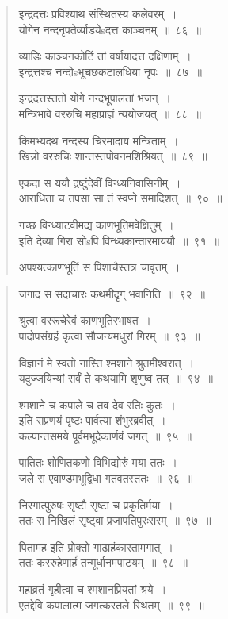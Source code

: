 \documentclass[11pt, openany]{book}
\begin{document}
\begin{multicols}{2}
\begin{quote}
{इन्द्रदत्तः प्रविश्याथ संस्थितस्य कलेवरम्~।\\
योगेन नन्दनृपतेर्व्याड्येsदत्त काञ्चनम्~॥~८६~॥

व्याडिः काञ्चनकोटिं तां वर्षायादत्त दक्षिणाम्~।\\
इन्द्रत्तश्च नन्दोsभूचछकटालधिया नृपः~॥~८७~॥

इन्द्रदत्तस्ततो योगे नन्दभूपालतां भजन्~।\\
मन्त्रिभावे वररुचि महाप्राज्ञं न्ययोजयत्~॥~८८~॥

किमभ्यदथ नन्दस्य चिरमादाय मन्त्रिताम्~।\\
खिन्नो वररुचिः शान्तस्तपोवनमशिश्रियत्~॥~८९~॥

एकदा स ययौ द्रष्टुंदेवीं विन्ध्यनिवासिनीम्~।\\
आराधिता च तपसा सा तं स्वप्ने समादिशत्~॥~९०~॥

गच्छ विन्ध्याटवीमद्य काणभूतिमवेक्षितुम्~।\\
इति देव्या गिरा सोsपि विन्ध्यकान्तारमाययौ~॥~९१~॥

अपश्यत्काणभूतिं स पिशाचैस्तत्र चावृतम्~।\\}
\end{quote}

\columnbreak

\begin{quote}
{\mbh जगाद स सदाचारः कथमीदृग् भवानिति~॥~९२~॥

श्रुत्वा वररूचेरेवं काणभूतिरभाषत~।\\
पादोपसंग्रहं कृत्वा सौजन्यमधुरां गिरम्~॥~९३~॥

विज्ञानं मे स्वतो नास्ति श्मशाने श्रुतमीश्वरात्~।\\
यदुज्जयिन्यां सर्वं ते कथयामि शृणुष्व तत्~॥~९४~॥

श्मशाने च कपाले च तव देव रतिः कुतः~।\\
इति सप्रणयं पृष्टः पार्वत्या शंभुरब्रवीत्~।\\
कल्पान्तसमये पूर्वमभूदेकार्णवं जगत्~॥~९५~॥

पातितः शोणितकणो विभिद्योरुं मया ततः~।\\
जले स एवाण्डमभूद्विधा गतवतस्ततः~॥~९६~॥

निरगात्पुरुषः सृष्टौ सृष्टा च प्रकृतिर्मया~।\\
ततः स निखिलं सृष्ट्वा प्रजापतिपुरःसरम्~॥~९७~॥

पितामह इति प्रोक्तो गाढाहंकारतामगात्~।\\
ततः कररुहेणाहंं तन्मूर्धानमपाटयम्~॥~९८~॥

महाव्रतं गृहीत्वा च श्मशानप्रियतां श्रये~।\\
एतद्देवि कपालात्म जगत्करतले स्थितम्~॥~९९~॥

}
\end{quote}
\end{multicols}
\end{document}
